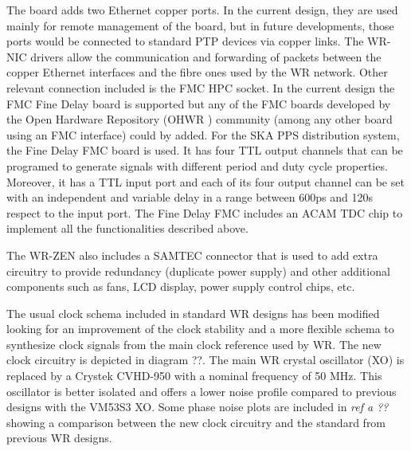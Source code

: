 The board adds two Ethernet copper ports. In the current design, they are used mainly for remote management of the board, but in future developments, those ports would be connected to standard PTP devices via copper links. The WR-NIC drivers allow the communication and forwarding of packets between the copper Ethernet interfaces and the fibre ones used by the WR network. Other relevant connection included is the FMC HPC socket. In the current design the FMC Fine Delay board 
is supported but any of the FMC boards developed by the Open Hardware 
Repository (OHWR \cite{ohwr:repo}) community (among any other board using an FMC interface) could by added. For the SKA PPS distribution system, the Fine Delay FMC board \cite{ohwr:fmc-fine-delay} is used. It has four TTL output channels that can be programed to generate signals with different period and duty cycle properties. Moreover, it has a TTL input port and each of its four output channel can be set with an independent and variable delay in a range between 600ps and 120s respect to the input port. The Fine Delay FMC includes an ACAM TDC chip to implement all the functionalities described above. 

The WR-ZEN also includes a SAMTEC connector that is used to add extra circuitry to provide redundancy (duplicate power supply) and other additional components such as fans, LCD display, power supply control chips, etc.

The usual clock schema included in standard WR designs has been modified looking for an improvement of the clock stability and a more flexible schema to synthesize clock signals from the main clock reference used by WR. The new clock circuitry is depicted in diagram ??. The main WR crystal oscillator (XO) is replaced by a Crystek CVHD-950 with a nominal frequency of 50 MHz. This oscillator is better isolated and offers a lower noise profile compared to previous designs with the VM53S3 XO. Some phase noise plots are included in  \textit{ref a ??} showing a comparison between the new clock circuitry and the standard from previous WR designs. 

